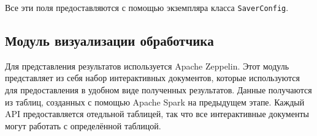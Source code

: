 Все эти поля предоставляются с помощью экземпляра класса \texttt{SaverConfig}.


\subsection{Модуль визуализации обработчика}
Для представления результатов используется Apache Zeppelin.
Этот модуль представляет из себя набор интерактивных документов, которые используются для предоставления в удобном виде полученных результатов.
Данные получаются из таблиц, созданных с помощью Apache Spark на предыдущем этапе.
Каждый API предоставляется отедльной таблицей, так что все интерактивные документы могут работать с определённой таблицой.